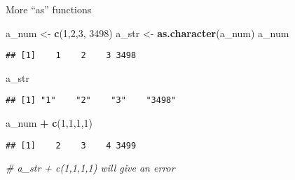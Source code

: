 \documentclass[ignorenonframetext,]{beamer}
\newenvironment{Shaded}{\begin{snugshade}}{\end{snugshade}}
\newcommand{\KeywordTok}[1]{\textcolor[rgb]{0.13,0.29,0.53}{\textbf{#1}}}
\newcommand{\DecValTok}[1]{\textcolor[rgb]{0.00,0.00,0.81}{#1}}
\newcommand{\StringTok}[1]{\textcolor[rgb]{0.31,0.60,0.02}{#1}}
\newcommand{\CommentTok}[1]{\textcolor[rgb]{0.56,0.35,0.01}{\textit{#1}}}
\newcommand{\OperatorTok}[1]{\textcolor[rgb]{0.81,0.36,0.00}{\textbf{#1}}}
\newcommand{\NormalTok}[1]{#1}
\begin{document}
\begin{frame}[fragile]{More ``as'' functions}

\begin{Shaded}
\begin{Highlighting}[]
\NormalTok{a_num <-}\StringTok{ }\KeywordTok{c}\NormalTok{(}\DecValTok{1}\NormalTok{,}\DecValTok{2}\NormalTok{,}\DecValTok{3}\NormalTok{, }\DecValTok{3498}\NormalTok{)}
\NormalTok{a_str <-}\StringTok{ }\KeywordTok{as.character}\NormalTok{(a_num)}
\NormalTok{a_num}
\end{Highlighting}
\end{Shaded}

\begin{verbatim}
## [1]    1    2    3 3498
\end{verbatim}

\begin{Shaded}
\begin{Highlighting}[]
\NormalTok{a_str}
\end{Highlighting}
\end{Shaded}

\begin{verbatim}
## [1] "1"    "2"    "3"    "3498"
\end{verbatim}

\begin{Shaded}
\begin{Highlighting}[]
\NormalTok{a_num }\OperatorTok{+}\StringTok{ }\KeywordTok{c}\NormalTok{(}\DecValTok{1}\NormalTok{,}\DecValTok{1}\NormalTok{,}\DecValTok{1}\NormalTok{,}\DecValTok{1}\NormalTok{)}
\end{Highlighting}
\end{Shaded}

\begin{verbatim}
## [1]    2    3    4 3499
\end{verbatim}

\begin{Shaded}
\begin{Highlighting}[]
\CommentTok{# a_str + c(1,1,1,1) will give an error}
\end{Highlighting}
\end{Shaded}

\end{frame}
\end{document}
